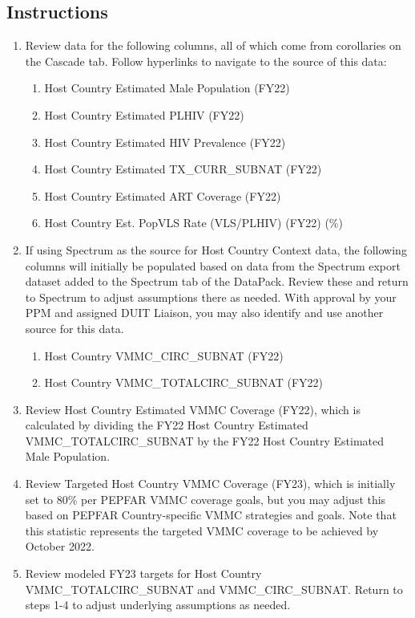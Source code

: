 \documentclass[
  openany]{book}
\begin{document}
\hypertarget{instructions-28}{%
\subsection{Instructions}\label{instructions-28}}

\begin{enumerate}
\def\labelenumi{\arabic{enumi}.}
\item
  Review data for the following columns, all of which come from
  corollaries on the Cascade tab. Follow hyperlinks to navigate to the
  source of this data:

  \begin{enumerate}
  \def\labelenumii{\alph{enumii}.}
  \item
    Host Country Estimated Male Population (FY22)
  \item
    Host Country Estimated PLHIV (FY22)
  \item
    Host Country Estimated HIV Prevalence (FY22)
  \item
    Host Country Estimated TX\_CURR\_SUBNAT (FY22)
  \item
    Host Country Estimated ART Coverage (FY22)
  \item
    Host Country Est. PopVLS Rate (VLS/PLHIV) (FY22) (\%)
  \end{enumerate}
\item
  If using Spectrum as the source for Host Country Context data, the
  following columns will initially be populated based on data from the
  Spectrum export dataset added to the Spectrum tab of the DataPack.
  Review these and return to Spectrum to adjust assumptions there as
  needed. With approval by your PPM and assigned DUIT Liaison, you may
  also identify and use another source for this data.

  \begin{enumerate}
  \def\labelenumii{\alph{enumii}.}
  \item
    Host Country VMMC\_CIRC\_SUBNAT (FY22)
  \item
    Host Country VMMC\_TOTALCIRC\_SUBNAT (FY22)
  \end{enumerate}
\item
  Review Host Country Estimated VMMC Coverage (FY22), which is
  calculated by dividing the FY22 Host Country Estimated
  VMMC\_TOTALCIRC\_SUBNAT by the FY22 Host Country Estimated Male
  Population.
\item
  Review Targeted Host Country VMMC Coverage (FY23), which is
  initially set to 80\% per PEPFAR VMMC coverage goals, but you may
  adjust this based on PEPFAR Country-specific VMMC strategies and
  goals. Note that this statistic represents the targeted VMMC
  coverage to be achieved by October 2022.
\item
  Review modeled FY23 targets for Host Country VMMC\_TOTALCIRC\_SUBNAT
  and VMMC\_CIRC\_SUBNAT. Return to steps 1-4 to adjust underlying
  assumptions as needed.
\end{enumerate}
\end{document}
